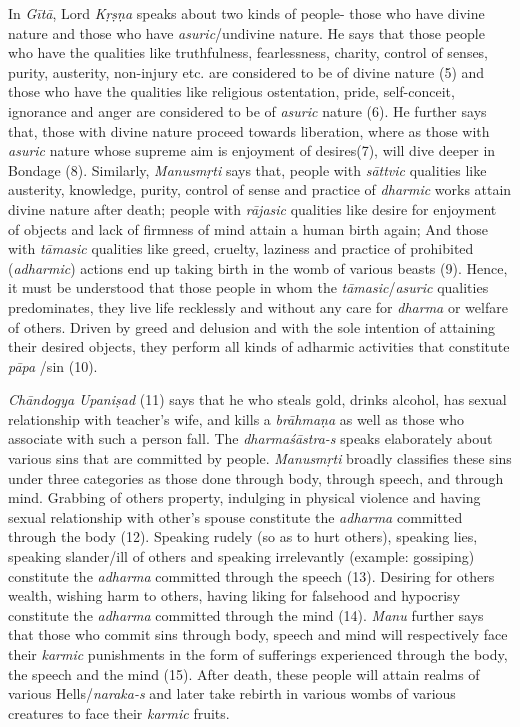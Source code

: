 In \emph{Gītā}, Lord \emph{Kṛṣṇa} speaks about two kinds of people- those who have divine nature and those who have \emph{asuric}/undivine nature. He says that those people who have the qualities like truthfulness, fearlessness, charity, control of senses, purity, austerity, non-injury etc. are considered to be of divine nature (5) and those who have the qualities like religious ostentation, pride, self-conceit, ignorance and anger are considered to be of \emph{asuric} nature (6). He further says that, those with divine nature proceed towards liberation, where as those with \emph{asuric} nature whose supreme aim is enjoyment of desires(7), will dive deeper in Bondage (8). Similarly, \emph{Manusmṛti} says that, people with \emph{sāttvic} qualities like austerity, knowledge, purity, control of sense and practice of \emph{dharmic} works attain divine nature after death; people with \emph{rājasic} qualities like desire for enjoyment of objects and lack of firmness of mind attain a human birth again; And those with \emph{tāmasic} qualities like greed, cruelty, laziness and practice of prohibited (\emph{adharmic}) actions end up taking birth in the womb of various beasts (9). Hence, it must be understood that those people in whom the \emph{tāmasic}/\emph{asuric} qualities predominates, they live life recklessly and without any care for \emph{dharma} or welfare of others. Driven by greed and delusion and with the sole intention of attaining their desired objects, they perform all kinds of adharmic activities that constitute \emph{pāpa} /sin (10).

\emph{Chāndogya} \emph{Upaniṣad} (11) says that he who steals gold, drinks alcohol, has sexual relationship with teacher's wife, and kills a \emph{brāhmaṇa} as well as those who associate with such a person fall. The \emph{dharmaśāstra-s} speaks elaborately about various sins that are committed by people. \emph{Manusmṛti} broadly classifies these sins under three categories as those done through body, through speech, and through mind. Grabbing of others property, indulging in physical violence and having sexual relationship with other's spouse constitute the \emph{adharma} committed through the body (12). Speaking rudely (so as to hurt others), speaking lies, speaking slander/ill of others and speaking irrelevantly (example: gossiping) constitute the \emph{adharma} committed through the speech (13). Desiring for others wealth, wishing harm to others, having liking for falsehood and hypocrisy constitute the \emph{adharma} committed through the mind (14). \emph{Manu} further says that those who commit sins through body, speech and mind will respectively face their \emph{karmic} punishments in the form of sufferings experienced through the body, the speech and the mind (15). After death, these people will attain realms of various Hells/\emph{naraka-s} and later take rebirth in various wombs of various creatures to face their \emph{karmic} fruits.

